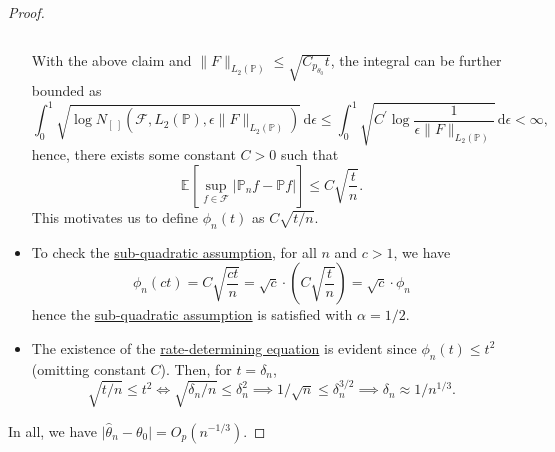 \begin{proof}
\begin{itemize}
\begin{claim}
\[			      \]
		      \end{claim}
		      With the above claim and \(\lVert F \rVert _{L_2(\mathbb{P} )} \leq \sqrt{C_{p_{\theta _0}} t} \), the integral can be further bounded as
		      \[
			      \int_{0}^{1} \sqrt{\log N_{[\ ]}(\mathscr{F} , L_2(\mathbb{P} ), \epsilon \lVert F \rVert _{L_2(\mathbb{P} )})} \,\mathrm{d}\epsilon
			      \leq \int_{0}^{1} \sqrt{C^{\prime} \log \frac{1}{\epsilon \lVert F \rVert _{L_2(\mathbb{P} )}} } \,\mathrm{d}\epsilon
			      < \infty,
		      \]
		      hence, there exists some constant \(C> 0\) such that
		      \[
			      \mathbb{E}_{}\left[\sup _{f\in \mathscr{F} } \vert \mathbb{P} _n f - \mathbb{P} f \vert  \right]
			      \leq C \sqrt{\frac{t}{n}}.
		      \]
		      This motivates us to define \(\phi _n (t)\) as \(C \sqrt{t / n} \).
		\item To check the \hyperref[def:sub-quadratic-assumption]{sub-quadratic assumption}, for all \(n\) and \(c > 1\), we have
		      \[
			      \phi _n (ct)
			      = C \sqrt{\frac{ct}{n}}
			      = \sqrt{c} \cdot \left( C \sqrt{\frac{t}{n}} \right)
			      = \sqrt{c} \cdot \phi _n
		      \]
		      hence the \hyperref[def:sub-quadratic-assumption]{sub-quadratic assumption} is satisfied with \(\alpha = 1 / 2\).
		\item The existence of the \hyperref[def:rate-determining-equation]{rate-determining equation} is evident since \(\phi _n(t) \leq t^2\) (omitting constant \(C\)). Then, for \(t = \delta _n\),
		      \[
			      \sqrt{t / n} \leq t^2
			      \iff \sqrt{\delta _n / n} \leq \delta _n^2
			      \implies 1 / \sqrt{n} \leq \delta _n^{3 / 2}
			      \implies \delta _n \approx 1 / n^{1 / 3}.
		      \]
	\end{itemize}
	In all, we have \(\vert \hat{\theta} _n - \theta _0 \vert = O_p(n^{-1 / 3})\).
\end{proof}